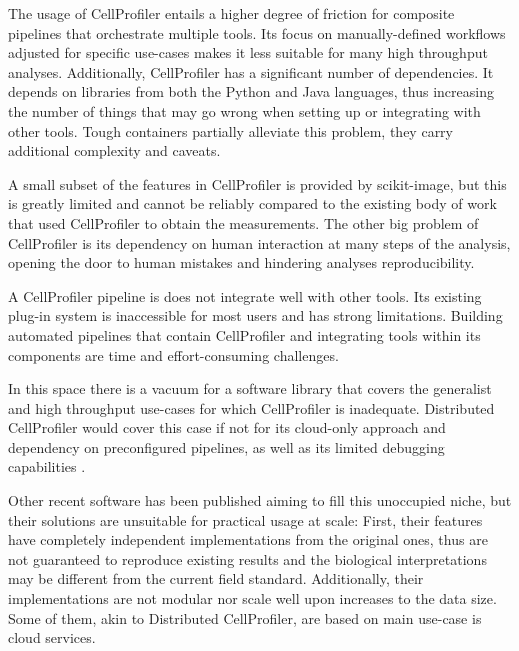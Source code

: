 \documentclass{article}
\begin{document}
The usage of CellProfiler entails a higher degree of friction for composite pipelines that orchestrate multiple tools. Its focus on manually-defined workflows adjusted for specific use-cases makes it less suitable for many high throughput analyses. Additionally, CellProfiler has a significant number of dependencies. It depends on libraries from both the Python and Java languages, thus increasing the number of things that may go wrong when setting up or integrating with other tools. Tough containers partially alleviate this problem, they carry additional complexity and caveats.

A small subset of the features in CellProfiler is provided by scikit-image, but this is greatly limited and cannot be reliably compared to the existing body of work that used CellProfiler to obtain the measurements. The other big problem of CellProfiler is its dependency on human interaction at many steps of the analysis, opening the door to human mistakes and hindering analyses reproducibility.

A CellProfiler pipeline is does not integrate well with other tools. Its existing plug-in system is inaccessible for most users and has strong limitations. Building automated pipelines that contain CellProfiler and integrating tools within its components are time and effort-consuming challenges.

In this space there is a vacuum for a software library that covers the generalist and high throughput use-cases for which CellProfiler is inadequate. Distributed CellProfiler would cover this case if not for its cloud-only approach and dependency on preconfigured pipelines, as well as its limited debugging capabilities \citep{mcquinCellProfiler30Nextgeneration2018}.

Other recent software has been published aiming to fill this unoccupied niche, but their solutions are unsuitable for practical usage at scale: First, their features have completely independent implementations from the original ones, thus are not guaranteed to reproduce existing results and the biological interpretations may be different from the current field standard. Additionally, their implementations are not modular nor scale well upon increases to the data size. Some of them, akin to Distributed CellProfiler, are based on main use-case is cloud services.
\end{document}
